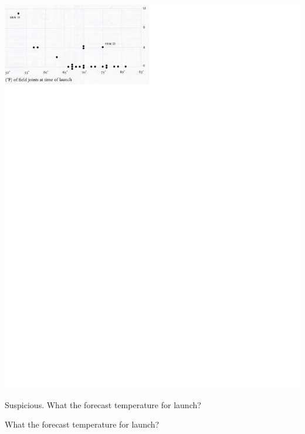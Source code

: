 \documentclass[pdflatex,landscape,titlepage]{foils}
\begin{document}
\begin{center}
\includegraphics[width=9.5 in]{tufte_challenger_1}
\end{center}


Suspicious.  What the forecast temperature for launch?  

\bgclear

What the forecast temperature for launch?
\end{document}
